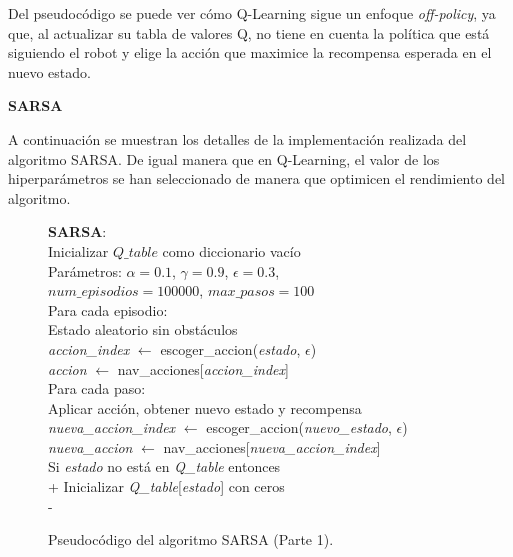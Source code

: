 \documentclass[conference,a4paper]{IEEEtran}
\begin{document}
Del pseudocódigo se puede ver cómo Q-Learning sigue un enfoque \textit{off-policy}, ya que, al actualizar su tabla de valores Q,
no tiene en cuenta la política que está siguiendo el robot y elige la acción que maximice la recompensa esperada en el nuevo estado.\newline

\textbf{SARSA\newline}

A continuación se muestran los detalles de la implementación realizada del algoritmo SARSA. De igual manera que en Q-Learning, el valor de los hiperparámetros
se han seleccionado de manera que optimicen el rendimiento del algoritmo. 

\begin{figure}[!h]
  \begin{minipage}{\linewidth}
  \begin{pseudo}
  \textbf{SARSA}: \\
  Inicializar $Q\_table$ como diccionario vacío \\
  Parámetros: $\alpha = 0.1$, $\gamma = 0.9$, $\epsilon = 0.3$, \\ $num\_episodios = 100000$, $max\_pasos = 100$ \\
  Para cada episodio: \\
  \> Estado aleatorio sin obstáculos \\
  \> \textit{accion\_index} $\leftarrow$ escoger\_accion(\textit{estado}, $\epsilon$) \\
  \> \textit{accion} $\leftarrow$ nav\_acciones[\textit{accion\_index}] \\
  \> Para cada paso: \\
  \> \> Aplicar acción, obtener nuevo estado y recompensa \\
  \> \> \textit{nueva\_accion\_index} $\leftarrow$ escoger\_accion(\textit{nuevo\_estado}, $\epsilon$) \\
  \> \> \textit{nueva\_accion} $\leftarrow$ nav\_acciones[\textit{nueva\_accion\_index}] \\
  Si \textit{estado} \textnormal{no está en} \textit{Q\_table} entonces \\+
  Inicializar \textit{Q\_table}[\textit{estado}] con ceros \\-

  \end{pseudo}
  \end{minipage}
  \caption{Pseudocódigo del algoritmo SARSA (Parte 1).}
  \label{fig:sarsa1}
\end{figure}
\end{document}
